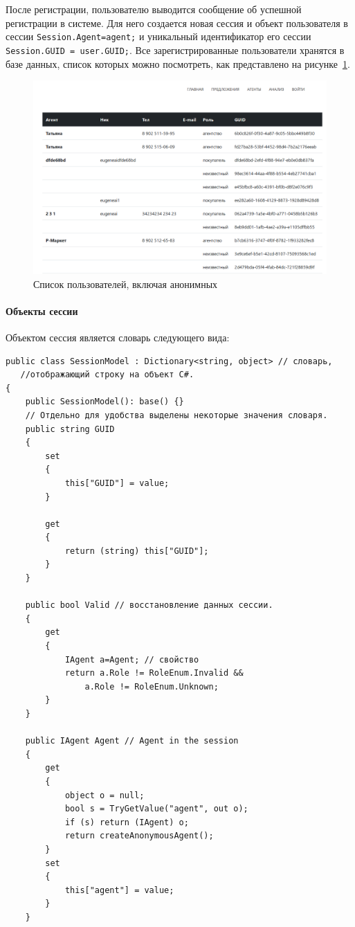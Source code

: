 \documentclass[a4paper,14pt,openany,final]{extreport} %
\def\oldcaption{} \let\oldcaption=\caption
\def\caption{\stepcounter{captionsnum}\oldcaption}
\begin{document}
{После регистрации, пользователю выводится сообщение об успешной регистрации в системе. Для него создается новая сессия и  объект пользователя в сессии \verb|Session.Agent=agent;| и уникальный идентификатор его сессии \verb|Session.GUID = user.GUID;|. Все зарегистрированные пользователи хранятся в базе данных, список которых можно посмотреть, как представлено на рисунке~\ref{fig:userlist}.
\begin{figure}[htbp]
  \centering
  \includegraphics[width=0.8\linewidth]{screen-user-list.png}
  \caption{Список пользователей, включая анонимных}
  \label{fig:userlist}
\end{figure}

\paragraph{Объекты сессии}
Объектом сессия является словарь следующего вида:
\begin{verbatim}
public class SessionModel : Dictionary<string, object> // словарь,
   //отображающий строку на объект C#.
{
    public SessionModel(): base() {}
    // Отдельно для удобства выделены некоторые значения словаря.
    public string GUID
    {
        set
        {
            this["GUID"] = value;
        }

        get
        {
            return (string) this["GUID"];
        }
    }

    public bool Valid // восстановление данных сессии.
    {
        get
        {
            IAgent a=Agent; // свойство
            return a.Role != RoleEnum.Invalid &&
                a.Role != RoleEnum.Unknown;
        }
    }

    public IAgent Agent // Agent in the session
    {
        get
        {
            object o = null;
            bool s = TryGetValue("agent", out o);
            if (s) return (IAgent) o;
            return createAnonymousAgent();
        }
        set
        {
            this["agent"] = value;
        }
    }


\end{verbatim}}
\end{document}
